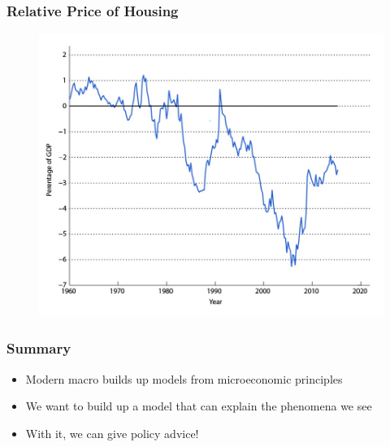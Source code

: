 \documentclass{beamer}
\begin{document}
\begin{frame}
\frametitle[alignment=center]{Relative Price of Housing}
\begin{figure}
\includegraphics[scale=0.6]{Figures/W_Fig_1pt17.png}
\end{figure}
\end{frame}

\begin{frame}
\frametitle[alignment=center]{Summary}
\begin{itemize}
\item Modern macro builds up models from microeconomic principles
\bigskip
\item We want to build up a model that can explain the phenomena we see
\bigskip
\item With it, we can give policy advice!

\end{itemize}
\end{frame}
\end{document}
